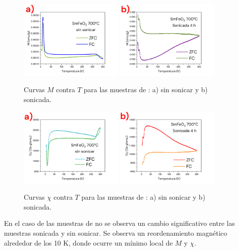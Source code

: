 \documentclass[../main.tex]{subfiles}
\begin{document}
\begin{figure}[H]
    \centering
    \includegraphics[width=0.45\textwidth]{fig/MvTSm.png}
    \quad
    \includegraphics[width=0.45\textwidth]{fig/MvTSm-S.png}
    \caption{Curvas $M$ contra $T$ para las muestras de \sama{}: a) sin sonicar y b) sonicada.}
    \label{fig:MvTSm}
\end{figure}
\begin{figure}[H]
    \centering
    \includegraphics[width=0.45\textwidth]{fig/chivTSm.png}
    \quad
    \includegraphics[width=0.45\textwidth]{fig/chivTSm-S.png}
    \caption{Curvas $\chi$ contra $T$ para las muestras de \sama{}: a) sin sonicar y b) sonicada.}
    \label{fig:chivTSm}
\end{figure}
En el caso de las muestras de \neod{} no se observa un cambio significativo entre las muestras sonicada y sin sonicar. Se observa un reordenamiento magnético alrededor de los 10 K, donde ocurre un mínimo local de $M$ y $\chi$.
\end{document}
